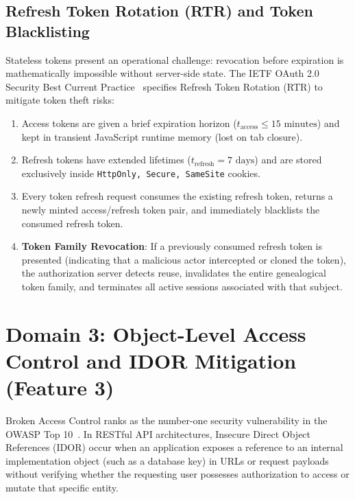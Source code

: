 \documentclass[10pt,twocolumn,a4paper]{article}
\begin{document}
\subsection{Refresh Token Rotation (RTR) and Token Blacklisting}
Stateless tokens present an operational challenge: revocation before expiration is mathematically impossible without server-side state. The IETF OAuth 2.0 Security Best Current Practice~\cite{ietf_oauth_bcp} specifies Refresh Token Rotation (RTR) to mitigate token theft risks:
\begin{enumerate}[leftmargin=*]
    \item Access tokens are given a brief expiration horizon ($t_{\text{access}} \le 15\text{ minutes}$) and kept in transient JavaScript runtime memory (lost on tab closure).
    \item Refresh tokens have extended lifetimes ($t_{\text{refresh}} = 7\text{ days}$) and are stored exclusively inside \texttt{HttpOnly, Secure, SameSite} cookies.
    \item Every token refresh request consumes the existing refresh token, returns a newly minted access/refresh token pair, and immediately blacklists the consumed refresh token.
    \item \textbf{Token Family Revocation}: If a previously consumed refresh token is presented (indicating that a malicious actor intercepted or cloned the token), the authorization server detects reuse, invalidates the entire genealogical token family, and terminates all active sessions associated with that subject.
\end{enumerate}

\section{Domain 3: Object-Level Access Control and IDOR Mitigation (Feature 3)}
\label{sec:idor}
Broken Access Control ranks as the number-one security vulnerability in the OWASP Top 10~\cite{owasp_top10_2021}. In RESTful API architectures, Insecure Direct Object References (IDOR) occur when an application exposes a reference to an internal implementation object (such as a database key) in URLs or request payloads without verifying whether the requesting user possesses authorization to access or mutate that specific entity.
\end{document}
